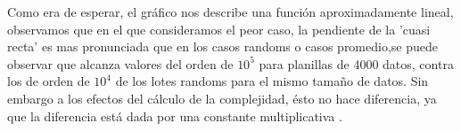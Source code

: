 Como era de esperar, el gráfico nos describe una función aproximadamente lineal, observamos que en el que consideramos el peor caso, la pendiente de la 'cuasi recta' es mas pronunciada que en los casos randoms o casos promedio,se puede observar que alcanza valores del orden de $10^{5}$ para planillas de 4000 datos, contra los de orden de $10^{4}$ de los lotes randoms para el mismo tamaño de datos. 
\newline
Sin embargo a los efectos del cálculo de la complejidad, ésto no hace diferencia, ya que la diferencia está dada por una constante multiplicativa .
